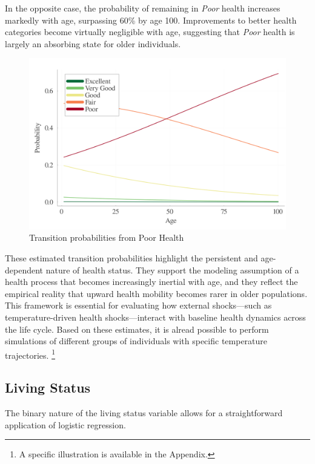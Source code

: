 \documentclass{article}
\begin{document}
In the opposite case, the probability of remaining in \textit{Poor} health increases markedly with age, surpassing 60\% by age 100.
Improvements to better health categories become virtually negligible with age, suggesting that \textit{Poor} health is largely an absorbing state for older individuals.
\begin{figure}\label{fig:health_transition_5}
    \begin{center}
        \includegraphics[width=\linewidth]{output/health_transition_5.png}
        \caption{Transition probabilities from Poor Health}   
    \end{center} 
\end{figure}




These estimated transition probabilities highlight the persistent and age-dependent nature of health status. They support the modeling assumption of a health process that becomes increasingly inertial with age, and they reflect the empirical reality that upward health mobility becomes rarer in older populations. This framework is essential for evaluating how external shocks—such as temperature-driven health shocks—interact with baseline health dynamics across the life cycle.
Based on these estimates, 
it is alread possible to perform 
simulations of different groups of individuals with specific temperature trajectories. 
\footnote{A specific illustration is available in the Appendix.}

\subsection{Living Status}
The binary nature of the living status variable allows for a straightforward application of logistic regression.
\end{document}

